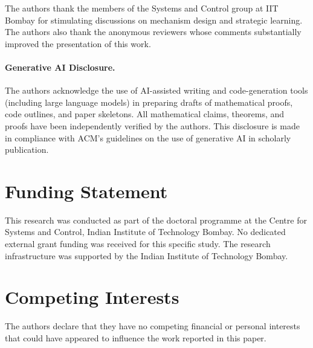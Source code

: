 \documentclass[acmsmall]{acmart}
\begin{document}

\maketitle















\begin{acks}
The authors thank the members of the Systems and Control group at IIT Bombay for
stimulating discussions on mechanism design and strategic learning. The authors
also thank the anonymous reviewers whose comments substantially improved the
presentation of this work.

\paragraph{Generative AI Disclosure.}
The authors acknowledge the use of AI-assisted writing and code-generation tools
(including large language models) in preparing drafts of mathematical proofs,
code outlines, and paper skeletons. All mathematical claims, theorems, and proofs
have been independently verified by the authors. This disclosure is made in
compliance with ACM's guidelines on the use of generative AI in scholarly
publication.
\end{acks}

\section*{Funding Statement}
This research was conducted as part of the doctoral programme at the Centre for
Systems and Control, Indian Institute of Technology Bombay. No dedicated external
grant funding was received for this specific study. The research infrastructure
was supported by the Indian Institute of Technology Bombay.

\section*{Competing Interests}
The authors declare that they have no competing financial or personal interests
that could have appeared to influence the work reported in this paper.



\end{document}
